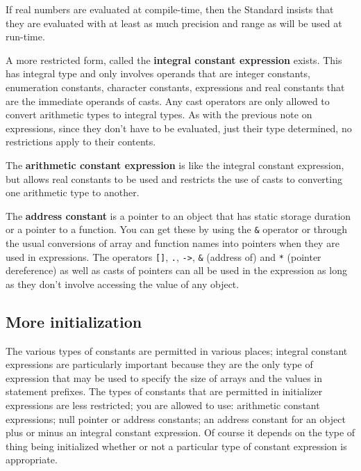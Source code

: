    If real numbers are evaluated at compile-time, then the Standard insists
    that they are evaluated with at least as much precision and range as will
    be used at run-time.


   A more restricted form, called the \textbf{integral constant
    expression} exists. This has integral type and only involves operands
    that are integer constants, enumeration constants, character constants,
    \sizeof{} expressions and real constants that are the immediate
    operands of casts. Any cast operators are only allowed to convert
    arithmetic types to integral types. As with the previous note on
    \sizeof{} expressions, since they don't have to be evaluated,
    just their type determined, no restrictions apply to their contents.


   The \textbf{arithmetic constant expression} is like the integral
    constant expression, but allows real constants to be used and restricts the
    use of casts to converting one arithmetic type to another.


   The \textbf{address constant} is a pointer to an object that has static
    storage duration or a pointer to a function. You can get these by using the
    \texttt{\&} operator or through the usual conversions of array and
    function names into pointers when they are used in expressions. The
    operators \texttt{[]}, \texttt{.}, \texttt{->},
    \texttt{\&} (address of) and \texttt{*} (pointer dereference) as
    well as casts of pointers can all be used in the expression as long as they
    don't involve accessing the value of any object.


  

  \subsection{More initialization}
   

   The various types of constants are permitted in various places; integral
    constant expressions are particularly important because they are the only
    type of expression that may be used to specify the size of arrays and the
    values in \case{} statement prefixes. The types of constants that
    are permitted in initializer expressions are less restricted; you are
    allowed to use: arithmetic constant expressions; null pointer or address
    constants; an address constant for an object plus or minus an integral
    constant expression. Of course it depends on the type of thing being
    initialized whether or not a particular type of constant expression is
    appropriate.


